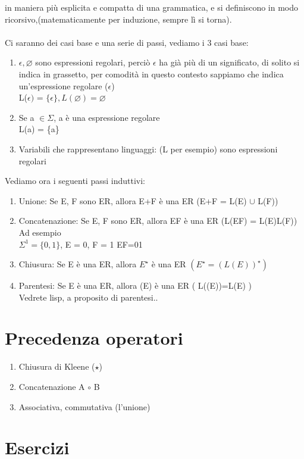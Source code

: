 \documentclass[12pt, a4paper, openany, oneside]{book}
\begin{document}
in maniera più esplicita e compatta di una grammatica, e si definiscono 
in modo ricorsivo,(matematicamente per induzione, sempre lì si torna).\\ \\
Ci saranno dei casi base e una serie di passi, vediamo i 3 casi base:
\begin{enumerate}
	\item $\epsilon, \varnothing$ sono espressioni regolari, perciò $\epsilon$ ha 
	già più di un significato, di solito si indica in grassetto, per comodità
	in questo contesto sappiamo che indica un'espressione regolare (\textbf{$\epsilon$})\\
	L($\epsilon)$ = $\{\epsilon\}, L(\varnothing) = \varnothing$
	\item Se a $\in \Sigma$, a è una espressione regolare \\
	L(a) = \{a\}
	\item Variabili che rappresentano linguaggi: (L per esempio) sono espressioni
	regolari
\end{enumerate}
Vediamo ora i seguenti passi induttivi:
\begin{enumerate}
	\item Unione: Se E, F sono ER, allora E+F è una ER (E+F = L(E) $\cup$ L(F))
	\item Concatenazione: Se E, F sono ER, allora EF è una ER (L(EF) = L(E)L(F))
	\\ Ad esempio \\
	$\Sigma^{1} = \{0,1\}$, E = 0, F = 1 EF=01
	\item Chiusura: Se E è una ER, allora $E^{\star}$ è una ER $(E^{\star}=(L(E))^{\star})$
	\item Parentesi: Se E è una ER, allora (E) è una ER (  L((E))=L(E)  ) \\
	Vedrete lisp, a proposito di parentesi..
\end{enumerate}
\section{Precedenza operatori}
\begin{enumerate}
	\item Chiusura di Kleene ($\star$)
	\item Concatenazione A $\circ$ B
	\item Associativa, commutativa (l'unione) 
\end{enumerate}
\section{Esercizi}
\end{document}
